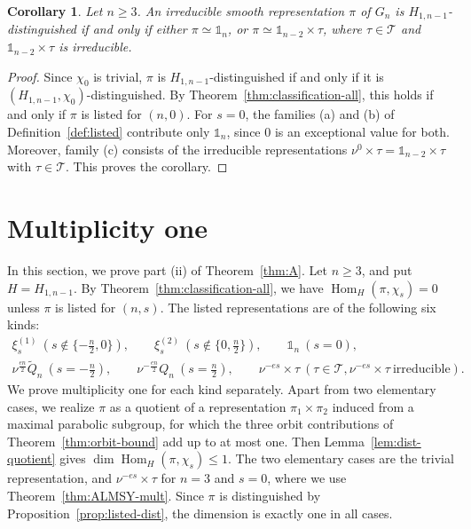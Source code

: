 \documentclass[11pt]{amsart}
\numberwithin{equation}{section}
\theoremstyle{plain}
\newtheorem{corollary}[theorem]{Corollary}
\theoremstyle{definition}
\theoremstyle{remark}
\newcommand{\one}{\mathds{1}}
\newcommand{\T}{\mathcal{T}}
\DeclareMathOperator{\Hom}{Hom}
\newcommand{\Qt}{\widetilde{Q}}
\newcommand{\xione}{\xi^{(1)}}
\newcommand{\xitwo}{\xi^{(2)}}
\begin{document}
\begin{corollary}\label{cor:linear-periods}
	Let $n\ge3$. An irreducible smooth representation $\pi$ of $G_n$ is $H_{1,n-1}$-distinguished if and only if either $\pi\simeq\one_n$, or $\pi\simeq\one_{n-2}\times\tau$, where $\tau\in\T$ and $\one_{n-2}\times\tau$ is irreducible.
\end{corollary}

\begin{proof}
	Since $\chi_0$ is trivial, $\pi$ is $H_{1,n-1}$-distinguished if and only if it is $(H_{1,n-1},\chi_0)$-distinguished. By Theorem~\ref{thm:classification-all}, this holds if and only if $\pi$ is listed for $(n,0)$. For $s=0$, the families (a) and (b) of Definition~\ref{def:listed} contribute only $\one_n$, since $0$ is an exceptional value for both. Moreover, family (c) consists of the irreducible representations $\nu^{0}\times\tau=\one_{n-2}\times\tau$ with $\tau\in\T$. This proves the corollary.
\end{proof}

\section{Multiplicity one}\label{sec:multiplicity}

In this section, we prove part (ii) of Theorem~\ref{thm:A}. Let $n\ge3$, and put $H=H_{1,n-1}$. By Theorem~\ref{thm:classification-all}, we have $\Hom_{H}(\pi,\chi_s)=0$ unless $\pi$ is listed for $(n,s)$. The listed representations are of the following six kinds:
\begin{gather*}
	\xione_s\ (s\notin\{-\tfrac n2,0\}),\qquad\xitwo_s\ (s\notin\{0,\tfrac n2\}),\qquad\one_n\ (s=0),\\
	\nu^{\frac{en}2}\Qt_n\ (s=-\tfrac n2),\qquad\nu^{-\frac{en}2}Q_n\ (s=\tfrac n2),\qquad\nu^{-es}\times\tau\ (\tau\in\T, \nu^{-es}\times\tau\ \text{irreducible}).
\end{gather*}
We prove multiplicity one for each kind separately. Apart from two elementary cases, we realize $\pi$ as a quotient of a representation $\pi_1\times\pi_2$ induced from a maximal parabolic subgroup, for which the three orbit contributions of Theorem~\ref{thm:orbit-bound} add up to at most one. Then Lemma~\ref{lem:dist-quotient} gives $\dim\Hom_H(\pi,\chi_s)\le1$. The two elementary cases are the trivial representation, and $\nu^{-es}\times\tau$ for $n=3$ and $s=0$, where we use Theorem~\ref{thm:ALMSY-mult}. Since $\pi$ is distinguished by Proposition~\ref{prop:listed-dist}, the dimension is exactly one in all cases.
\end{document}
